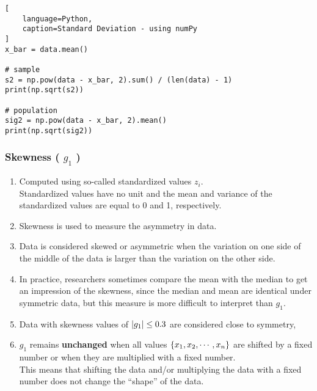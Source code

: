 \begin{lstlisting}[
    language=Python,
    caption=Standard Deviation - using numPy
]
x_bar = data.mean()

# sample
s2 = np.pow(data - x_bar, 2).sum() / (len(data) - 1)
print(np.sqrt(s2))

# population
sig2 = np.pow(data - x_bar, 2).mean()
print(np.sqrt(sig2))
\end{lstlisting}


\subsubsection{Skewness ( $g_1$ ) \cite{statistics/book/Statistics-for-Data-Scientists/Maurits-Kaptein}} \label{Data/Describing Data/Central Tendency/Skewness}

\begin{enumerate}
    \item Computed using so-called standardized values $z_i$. \hfill \cite{statistics/book/Statistics-for-Data-Scientists/Maurits-Kaptein} \\
    Standardized values have no unit and the mean and variance of the standardized values are equal to 0 and 1, respectively. \hfill \cite{statistics/book/Statistics-for-Data-Scientists/Maurits-Kaptein}

    \item Skewness is used to measure the asymmetry in data. \hfill \cite{statistics/book/Statistics-for-Data-Scientists/Maurits-Kaptein}

    \item Data is considered skewed or asymmetric when the variation on one side of the middle of the data is larger than the variation on the other side. \hfill \cite{statistics/book/Statistics-for-Data-Scientists/Maurits-Kaptein}

    \item In practice, researchers sometimes compare the mean with the median to get an impression of the skewness, since the median and mean are identical under symmetric data, but this measure is more difficult to interpret than $g_1$. \hfill \cite{statistics/book/Statistics-for-Data-Scientists/Maurits-Kaptein}

    \item Data with skewness values of $\left| g_1 \right| \leq 0.3$ are considered close to symmetry, \hfill \cite{statistics/book/Statistics-for-Data-Scientists/Maurits-Kaptein}

    \item $g_1$ remains \textbf{unchanged} when all values $\left\{x_1, x_2, \cdots, x_n\right\}$ are shifted by a fixed number or when they are multiplied with a fixed number. \hfill \cite{statistics/book/Statistics-for-Data-Scientists/Maurits-Kaptein} \\
    This means that shifting the data and/or multiplying the data with a fixed number does not change the “shape” of the data. \hfill \cite{statistics/book/Statistics-for-Data-Scientists/Maurits-Kaptein}
\end{enumerate}


